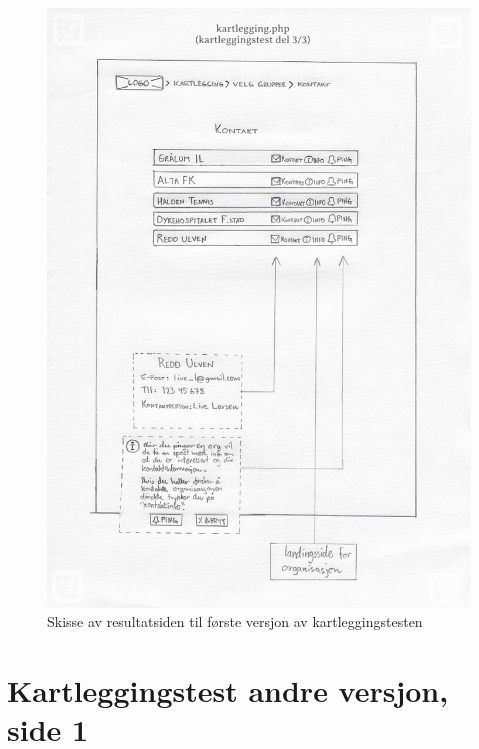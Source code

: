 \begin{figure}[H]
\centering
\includegraphics[width=.9\textwidth]{Illustrasjoner/Skisser-pdf/1.0/1-8-kartlegging-hjul-resultater.pdf}
\caption{Skisse av resultatsiden til første versjon av kartleggingstesten}
\label{vedlegg:1-8-kartlegging-hjul-res}
\end{figure}

\section{Kartleggingstest andre versjon, side 1}

